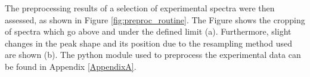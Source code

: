The preprocessing results of a selection of experimental spectra were then assessed, as shown in Figure \ref{fig:preproc_routine}. The Figure shows the cropping of spectra which go above and under the defined limit (a). Furthermore, slight changes in the peak shape and its position due to the resampling method used are shown (b). The python module used to preprocess the experimental data can be found in Appendix \ref{AppendixA}.


